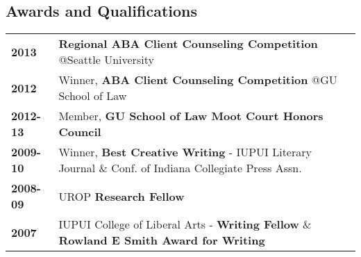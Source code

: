 \documentclass[letter, 12pt, oneside]{article}
\begin{document}
\begin{center}






\section{Awards and Qualifications} 

\begin{tabularx}{1\linewidth}{>{\raggedleft\scshape}p{3cm}X}
\textbf{2013}	&  \textbf{Regional ABA Client Counseling Competition} @Seattle University \\
\textbf{2012}    &  Winner, \textbf{ABA Client Counseling Competition} @GU School of Law \\
\textbf{2012-13}    &  Member, \textbf{GU School of Law Moot Court Honors Council} \\
\textbf{2009-10}    &  Winner, \textbf{Best Creative Writing} - IUPUI Literary Journal \& Conf. of Indiana Collegiate Press Assn. \\ 
\textbf{2008-09}    &  UROP \textbf{Research Fellow} \\
\textbf{2007}   &  IUPUI College of Liberal Arts - \textbf{Writing Fellow} \& \textbf{Rowland E Smith Award for Writing}                           
\end{tabularx}





\end{center}
\end{document}
